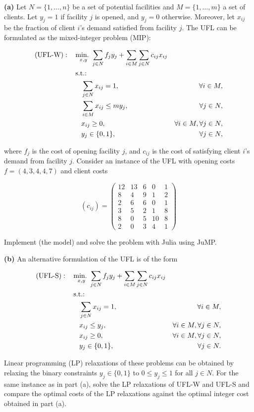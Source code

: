 \textbf{(a)}  Let $N = \{1,\dots,n\}$ be a set of potential facilities and $M = \{1,\dots,m\}$ a set of clients. Let $y_j = 1$ if facility $j$ is opened, and $y_j = 0$ otherwise. Moreover, let $x_{ij}$ be the fraction of client $i$'s demand satisfied from facility $j$. The UFL can be formulated as the mixed-integer problem (MIP): 

\begin{align}
 \text{(UFL-W)} : \quad &\mathop{\text{min.~}}_{x,y} \sum_{j\in N} f_jy_j + \sum_{i\in M}\sum_{j\in N} c_{ij}x_{ij} \label{IP:1}\\
       &\mathop{\text{s.t.:~}}\nonumber \\
       &\quad \sum_{j\in N}x_{ij} = 1, &\forall i \in M,\label{IP:2}\\
       &\quad \sum_{i\in M}x_{ij} \leq my_j, &\forall  j \in N,\label{IP:3}\\
       &\quad x_{ij} \geq 0, &\forall i \in M, \forall j \in N,\label{IP:4}\\
       &\quad y_j \in \{0,1\}, &\forall j\in N,\label{IP:5}
\end{align}

where $f_j$ is the cost of opening facility $j$, and $c_{ij}$ is the cost of satisfying client $i$'s demand from facility $j$. Consider an instance of the UFL with opening costs $f=(4,3,4,4,7)$ and client costs

\begin{equation*}
 (c_{ij}) = \left(
	\begin{array}{ccccc}
		12 & 13 & 6 & 0  & 1 \\
		8  & 4  & 9 & 1  & 2 \\
		2  & 6  & 6 & 0  & 1 \\
		3  & 5  & 2 & 1  & 8 \\
		8  & 0  & 5 & 10 & 8 \\
		2  & 0  & 3 & 4  & 1
	\end{array}
 \right)
\end{equation*}

Implement (the model) and solve the problem with Julia using JuMP.

\textbf{(b)} An alternative formulation of the UFL is of the form

\begin{align}
 \text{(UFL-S)} : \quad &\mathop{\text{min.~}}_{x,y} \sum_{j\in N}f_jy_j + \sum_{i\in M}\sum_{j\in N}c_{ij}x_{ij}\label{SIP:1}\\
       &\mathop{\text{s.t.:~}}\nonumber \\
       &\quad \sum_{j\in N}x_{ij} = 1, &\forall i \in M,\label{SIP:2}\\
       &\quad x_{ij} \leq y_j, &\forall  i\in M, \forall j \in N,\label{SIP:3}\\
       &\quad x_{ij} \geq 0, &\forall i \in M, \forall j \in N,\label{SIP:4}\\
       &\quad y_j \in \{0,1\}, &\forall j\in N.\label{SIP:5}
\end{align}


Linear programming (LP) relaxations of these problems can be obtained by relaxing the binary constraints $y_j\in \{0,1\}$ to $0 \leq y_j \leq 1$ for all $j \in N$. For the same instance as in part (a), solve the LP relaxations of UFL-W and UFL-S and compare the optimal costs of the LP relaxations against the optimal integer cost obtained in part (a).